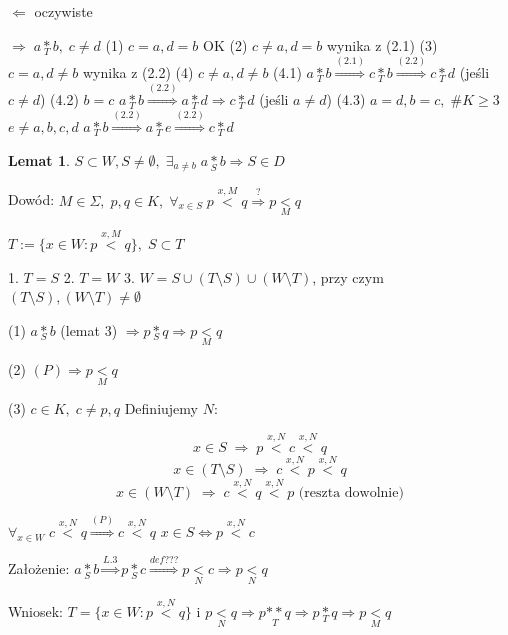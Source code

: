 \documentclass[12pt,a4paper]{article}
\theoremstyle{break}
\newtheorem{lemma}{Lemat}[section]
\begin{document}
	$\Leftarrow$ oczywiste  
	
	$\Rightarrow \; a\underset{T}{*}b, \; c\neq d$  
	(1) $c=a, d=b$ OK  
	(2) $c\neq a, d=b$ wynika z (2.1)  
	(3) $c=a, d\neq b$ wynika z (2.2)  
	(4) $c\neq a, d\neq b$  
	(4.1) $a\underset{T}{*}b \overset{(2.1)}{\Rightarrow} c\underset{T}{*}b \overset{(2.2)}{\Rightarrow} c\underset{T}{*}d$ (jeśli $c\neq d$)  
	(4.2) $b=c$  
	$a\underset{T}{*}b \overset{(2.2)}{\Rightarrow} a\underset{T}{*}d \Rightarrow c \underset{T}{*}d$ (jeśli $a\neq d$)  
	(4.3) $a=d, b=c, \; \#K\geq 3$  
	$e\neq a,b,c,d$  
	$a\underset{T}{*}b \overset{(2.2)}{\Rightarrow} a\underset{T}{*}e \overset{(2.2)}{\Rightarrow} c\underset{T}{*}d$  
	
	\begin{lemma}
		$S \subset W, S\neq \emptyset, \; \exists_{a\neq b} \; a\underset{S}{*}b \Rightarrow S\in D$
	\end{lemma}
	
	Dowód:  
	$M\in \Sigma, \; p,q \in K, \; \forall_{x\in S} \; p\overset{x,M}{<}q \overset{?}{\Rightarrow} p\underset{M}{<}q$  
	
	$T:=\{ x\in W : p\overset{x,M}{<}q\}, \; S\subset T$  
	
	1. $T=S$  
	2. $T=W$  
	3. $W=S \cup (T\setminus S) \cup (W\setminus T)$, przy czym $(T\setminus S),(W\setminus T)\neq \emptyset$  
	
	(1) $a\underset{S}{*}b$ (lemat 3) $\Rightarrow p\underset{S}{*}q \Rightarrow p\underset{M}{<}q$  
	
	(2) $(P) \Rightarrow p\underset{M}{<}q$  
	
	(3) $c\in K, \; c\neq p,q$  
	Definiujemy $N$:  
	
	\[
	x\in S \; \Rightarrow \; p\overset{x,N}{<}c\overset{x,N}{<}q  
	\]  
	\[
	x\in (T\setminus S) \; \Rightarrow \; c\overset{x,N}{<}p\overset{x,N}{<}q  
	\]  
	\[
	x\in (W\setminus T) \; \Rightarrow \; c\overset{x,N}{<}q\overset{x,N}{<}p \text{ (reszta dowolnie)}  
	\]
	
	$\forall_{x\in W} \; c\overset{x,N}{<}q \overset{(P)}{\Rightarrow} c\overset{x,N}{<}q$  
	$x\in S \Leftrightarrow p\overset{x,N}{<}c$  
	
	Założenie: $a\underset{S}{*}b \overset{L. 3}{\Rightarrow} p\underset{S}{*}c \overset{def ???}{\Rightarrow} p \underset{N}{<}c \Rightarrow p\underset{N}{<}q$  
	
	Wniosek:  
	$T=\{ x\in W : p\overset{x,N}{<}q\}$ i $p\underset{N}{<}q \Rightarrow p\underset{T}{**}q \Rightarrow p\underset{T}{*}q \Rightarrow p\underset{M}{<}q$  
	
\end{document}
